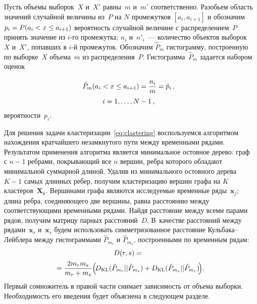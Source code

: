 \begin{multicols}{2}
 Пусть объемы выборок~$X$ и~$X'$ равны~$m$ и~$m'$ соответственно.
 Разобьем область значений случайной величины из~$P$ на $N$ промежутков
 $[a_{i}, a_{i+1}]$  и обозначим $p_i \hm= P(a_{i} \hm< x \hm\leq a_{i+1})$
 вероятность случайной величине с распределением~$P$ принять значение из $i$-го
 промежутка; $n_i$ и~$n'_i$~--- количество объектов выборок~$X$ и~$X'$, попавших
 в $i$-й промежуток. Обозначим $\hat{P}_{m}$ гистограмму, построенную по выборке~$X$
 объема~$m$ из распределения~$P$. Гистограмма~$\hat{P}_{m}$ задается
 набором оценок

 \noindent
\begin{multline}
\hat{P}_m(a_{i} < x \leq a_{i+1}) = \displaystyle\frac{\displaystyle n_{i}\mathstrut}{\displaystyle m\mathstrut} = \hat{p}_i\,,\\
i = 1,\dots,N-1\,,
\label{eq:hist}
\end{multline}
 вероятности~$p_i$.

 Для решения задачи кластеризации~\eqref{eq:clastering} вос\-пользуемся
 алгоритмом нахождения кратчайшего незамкнутого пути между временными
 рядами. Результатом применения алгоритма является минимальное остовное дерево:
 граф  с $n-1$ ребрами, покрывающий все $n$ вершин, ребра которого обладают
 минимальной суммарной длиной. Удалив из минимального остовного дерева $K-1$
 самых длинных ребер, получим кластеризацию вершин графа на $K$ кластеров~$\mathbf{X}_k$.
 Вершинами графа являются исследуемые временн$\acute{\mbox{ы}}$е ряды~$\mathbf{x}_j$;
 длина ребра, соединяющего две вершины, равна расстоянию между соответствующими
 временн$\acute{\mbox{ы}}$ми рядами. Найдя расстояние между всеми парами рядов,
 получим матрицу парных расстояний~$D$. В~качестве расстояний между
 рядами~$\mathbf{x}_r$ и~$\mathbf{x}_s$ будем использовать симметризованное
 расстояние Куль\-ба\-ка--Лейб\-ле\-ра между
 гистограммами $\hat{P}_{m_r}$ и $\hat{P}_{m_s}$, построенными по
 временн$\acute{\mbox{ы}}$м рядам:
   \begin{multline}
   \label{eq:matKLdist}
   D(r, s) = {}\\
\hspace*{-1.5mm}{}=\fr{2m_rm_s}{m_r + m_s}\!\left(\!D_{\KL}(\hat{P}_{m_r}||\hat{P}_{m_s}) +
   D_{\KL}(\hat{P}_{m_s}||\hat{P}_{m_r})\!\right)\!.\!\!\!\!
   \end{multline}
  Первый сомножитель в правой части снимает зависимость от объема выборки.
  Необходимость его введения будет объяснена  в следующем разделе.


\end{multicols}
